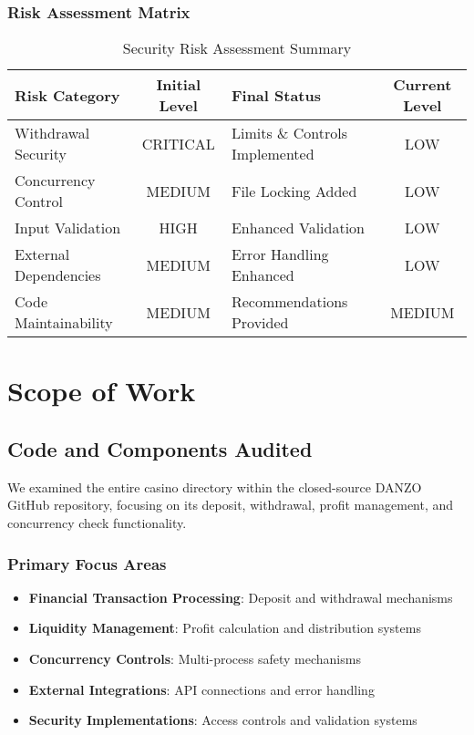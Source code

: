 \documentclass[11pt,a4paper]{report}
\begin{document}
\subsection{Risk Assessment Matrix}
\begin{table}[h]
\centering
\begin{tabular}{|l|c|l|c|}
\hline
\rowcolor{lightGray}
\textbf{Risk Category} & \textbf{Initial Level} & \textbf{Final Status} & \textbf{Current Level} \\
\hline
Withdrawal Security & \textcolor{danzoRed}{CRITICAL} & Limits \& Controls Implemented & \textcolor{danzoGreen}{LOW} \\
\hline
Concurrency Control & \textcolor{danzoOrange}{MEDIUM} & File Locking Added & \textcolor{danzoGreen}{LOW} \\
\hline
Input Validation & \textcolor{danzoRed}{HIGH} & Enhanced Validation & \textcolor{danzoGreen}{LOW} \\
\hline
External Dependencies & \textcolor{danzoOrange}{MEDIUM} & Error Handling Enhanced & \textcolor{danzoGreen}{LOW} \\
\hline
Code Maintainability & \textcolor{danzoOrange}{MEDIUM} & Recommendations Provided & \textcolor{danzoOrange}{MEDIUM} \\
\hline
\end{tabular}
\caption{Security Risk Assessment Summary}
\end{table}

\chapter{Scope of Work}

\section{Code and Components Audited}
We examined the entire casino directory within the closed-source DANZO GitHub repository, focusing on its deposit, withdrawal, profit management, and concurrency check functionality.

\subsection{Primary Focus Areas}
\begin{itemize}
    \item \textbf{Financial Transaction Processing}: Deposit and withdrawal mechanisms
    \item \textbf{Liquidity Management}: Profit calculation and distribution systems
    \item \textbf{Concurrency Controls}: Multi-process safety mechanisms
    \item \textbf{External Integrations}: API connections and error handling
    \item \textbf{Security Implementations}: Access controls and validation systems
\end{itemize}
\end{document}
